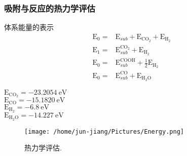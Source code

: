 \frame
{
	\frametitle{吸附与反应的热力学评估}
	体系能量的表示
	\begin{displaymath}
		\begin{aligned}
			\mathrm{E}_0=&\mathrm{E}_{sub}+\mathrm{E}_{\mathrm{CO_2}}+\mathrm{E}_\mathrm{H_2}\\
			\mathrm{E}_1=&\mathrm{E}_{sub}^{\mathrm{CO_2}}+\mathrm{E}_\mathrm{H_2}\\
			\mathrm{E}_0=&\mathrm{E}_{sub}^{\mathrm{COOH}}+\frac12\mathrm{E}_\mathrm{H_2}\\
			\mathrm{E}_0=&\mathrm{E}_{sub}^{\mathrm{CO}}+\mathrm{E}_\mathrm{H_2O}
		\end{aligned}
	\end{displaymath}
\begin{minipage}{0.43\textwidth}
	$\mathrm{E}_{\mathrm{CO_2}}=-23.2054~\mathrm{eV}$\\
	$\mathrm{E}_{\mathrm{CO}}=-15.1820~\mathrm{eV}$\\
	$\mathrm{E}_{\mathrm{H_2}}=-6.8~\mathrm{eV}$\\
	$\mathrm{E}_{\mathrm{H_2O}}=-14.227~\mathrm{eV}$
\end{minipage}
\hspace*{1pt}
\begin{minipage}{0.55\textwidth}
\begin{figure}[h!]
\vskip -0.6in
\hspace*{1.5in}
\centering
\texttt{[image: /home/jun-jiang/Pictures/Energy.png]}
\caption{\tiny \textrm{热力学评估.}}%
\label{Substrct_4}
\end{figure}
\end{minipage}
}
